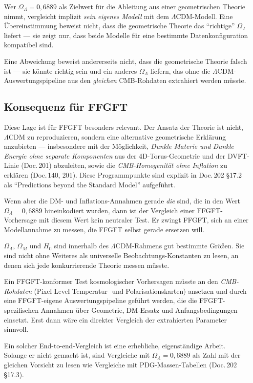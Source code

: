 \begin{important}
Wer \(\Omega_\Lambda = 0{,}6889\) als Zielwert für die Ableitung aus einer geometrischen Theorie nimmt, vergleicht implizit \emph{sein eigenes Modell} mit dem \(\Lambda\)CDM-Modell. Eine Übereinstimmung beweist nicht, dass die geometrische Theorie das ``richtige'' \(\Omega_\Lambda\) liefert — sie zeigt nur, dass beide Modelle für eine bestimmte Datenkonfiguration kompatibel sind.

Eine Abweichung beweist andererseits nicht, dass die geometrische Theorie falsch ist — sie könnte richtig sein und ein anderes \(\Omega_\Lambda\) liefern, das ohne die \(\Lambda\)CDM-Auswertungspipeline aus den \emph{gleichen} CMB-Rohdaten extrahiert werden müsste.
\end{important}

\subsection{Konsequenz für FFGFT}

Diese Lage ist für FFGFT besonders relevant. Der Ansatz der Theorie ist nicht, \(\Lambda\)CDM zu reproduzieren, sondern eine alternative geometrische Erklärung anzubieten — insbesondere mit der Möglichkeit, \emph{Dunkle Materie und Dunkle Energie ohne separate Komponenten} aus der 4D-Torus-Geometrie und der DVFT-Linie (Doc.\,201) abzuleiten, sowie die \emph{CMB-Homogenität ohne Inflation} zu erklären (Doc.\,140, 201). Diese Programmpunkte sind explizit in Doc.\,202 \S17.2 als ``Predictions beyond the Standard Model'' aufgeführt.

Wenn aber die DM- und Inflations-Annahmen gerade \emph{die} sind, die in den Wert \(\Omega_\Lambda = 0{,}6889\) hineinkodiert wurden, dann ist der Vergleich einer FFGFT-Vorhersage mit diesem Wert kein neutraler Test. Er zwingt FFGFT, sich an einer Modellannahme zu messen, die FFGFT selbst gerade ersetzen will.

\begin{conclusionBox}
\(\Omega_\Lambda\), \(\Omega_M\) und \(H_0\) sind innerhalb des \(\Lambda\)CDM-Rahmens gut bestimmte Größen. Sie sind nicht ohne Weiteres als universelle Beobachtungs-Konstanten zu lesen, an denen sich jede konkurrierende Theorie messen müsste.

Ein FFGFT-konformer Test kosmologischer Vorhersagen müsste an den \emph{CMB-Rohdaten} (Pixel-Level-Temperatur- und Polarisationskarten) ansetzen und durch eine FFGFT-eigene Auswertungspipeline geführt werden, die die FFGFT-spezifischen Annahmen über Geometrie, DM-Ersatz und Anfangsbedingungen einsetzt. Erst dann wäre ein direkter Vergleich der extrahierten Parameter sinnvoll.

Ein solcher End-to-end-Vergleich ist eine erhebliche, eigenständige Arbeit. Solange er nicht gemacht ist, sind Vergleiche mit \(\Omega_\Lambda = 0{,}6889\) als Zahl mit der gleichen Vorsicht zu lesen wie Vergleiche mit PDG-Massen-Tabellen (Doc.\,202 \S17.3).
\end{conclusionBox}

